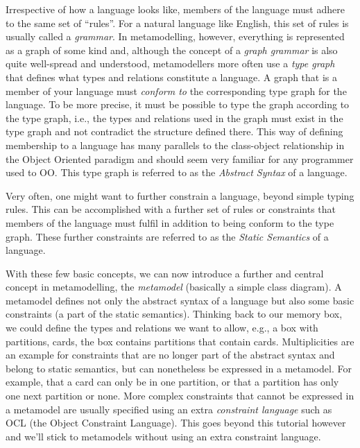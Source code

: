 Irrespective of how a language looks like, members of the language must adhere
to the same set of ``rules''.  
For a natural language like English, this set of rules is usually called a
\emph{grammar}.  
In metamodelling, however, everything is represented as a graph of some kind
and, although the concept of a  \emph{graph grammar} is also quite well-spread
and understood, metamodellers  more often use a \emph{type graph} that defines
what types and relations  constitute a language. 
A graph that is a member of your language must \emph{conform to} the
corresponding type graph for the language.  To be more precise, it must be
possible to type the graph according to the type graph, i.e., the types and
relations used in the graph must exist in the type graph and not contradict the
structure defined there.  
This way of defining membership to a language has many parallels to the
class-object relationship in the Object Oriented paradigm and should seem very
familiar for any programmer used to OO.  This type graph is referred to as the
\emph{Abstract Syntax} of a language. 

Very often, one might want to further constrain a language, beyond simple typing
rules.  
This can be accomplished with a further set of rules or constraints that
members of the language must fulfil in addition to being conform to the type
graph.
These further constraints are referred to as the \emph{Static Semantics}
of a language.    

With these few basic concepts, we can now introduce a further and central
concept in metamodelling, the \emph{metamodel} (basically a simple class
diagram). 
A metamodel defines not only the abstract syntax of a language but also some
basic constraints (a part of the static semantics).  
Thinking back to our memory box, we could define the types and relations we want
to allow, e.g.,  a box with partitions, cards, the box contains partitions that
contain cards. 
Multiplicities are an example for constraints that are no longer part of the
abstract syntax and belong to static semantics, but can nonetheless be expressed
in a metamodel.
For example, that a card can only be in one partition, or that a partition has
only one next partition or none.
More complex constraints that cannot be expressed in a metamodel are usually
specified using an extra \emph{constraint language} such as OCL (the Object
Constraint Language).
This goes beyond this tutorial however and we'll stick to metamodels without
using an extra constraint language.              

